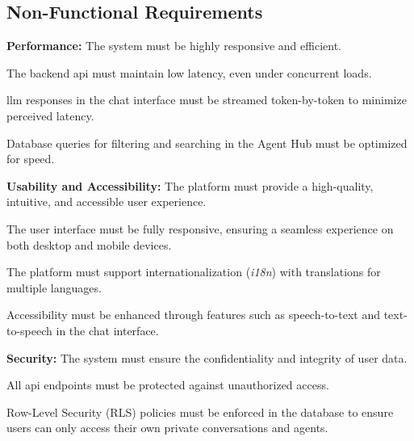 \subsection{Non-Functional Requirements}
\begin{nonfunctionalmod}[PERF]
    \item \textbf{Performance:} The system must be highly responsive and efficient.
    \begin{nonfunctionalmod}
        \item The backend \acs{api} must maintain low latency, even under concurrent loads.
        \item \Ac{llm} responses in the chat interface must be streamed token-by-token to minimize perceived latency.
        \item Database queries for filtering and searching in the Agent Hub must be optimized for speed.
    \end{nonfunctionalmod}
\end{nonfunctionalmod}

\begin{nonfunctionalmod}[USABIL]
    \item \textbf{Usability and Accessibility:} The platform must provide a high-quality, intuitive, and accessible user experience.
    \begin{nonfunctionalmod}
        \item The user interface must be fully responsive, ensuring a seamless experience on both desktop and mobile devices.
        \item The platform must support internationalization (\textit{i18n}) with translations for multiple languages.
        \item Accessibility must be enhanced through features such as speech-to-text and text-to-speech in the chat interface.
    \end{nonfunctionalmod}
\end{nonfunctionalmod}

\begin{nonfunctionalmod}[SEC]
    \item \textbf{Security:} The system must ensure the confidentiality and integrity of user data.
    \begin{nonfunctionalmod}
        \item All \acs{api} endpoints must be protected against unauthorized access.
        \item Row-Level Security (RLS) policies must be enforced in the database to ensure users can only access their own private conversations and agents.
    \end{nonfunctionalmod}
\end{nonfunctionalmod}

